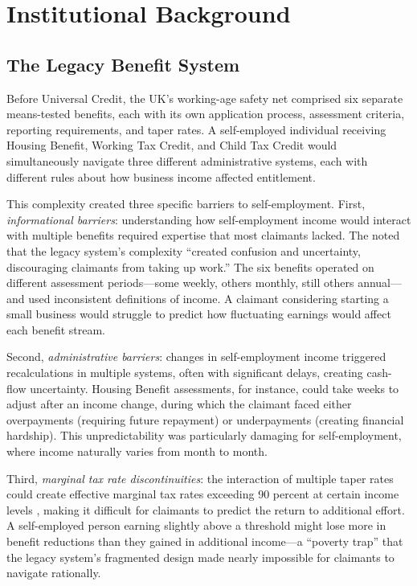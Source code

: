 \documentclass[12pt]{article}
\begin{document}
\section{Institutional Background}
\label{sec:background}

\subsection{The Legacy Benefit System}

Before Universal Credit, the UK's working-age safety net comprised six separate means-tested benefits, each with its own application process, assessment criteria, reporting requirements, and taper rates. A self-employed individual receiving Housing Benefit, Working Tax Credit, and Child Tax Credit would simultaneously navigate three different administrative systems, each with different rules about how business income affected entitlement.

This complexity created three specific barriers to self-employment. First, \textit{informational barriers}: understanding how self-employment income would interact with multiple benefits required expertise that most claimants lacked. The \citet{uk2013uc} noted that the legacy system's complexity ``created confusion and uncertainty, discouraging claimants from taking up work.'' The six benefits operated on different assessment periods---some weekly, others monthly, still others annual---and used inconsistent definitions of income. A claimant considering starting a small business would struggle to predict how fluctuating earnings would affect each benefit stream.

Second, \textit{administrative barriers}: changes in self-employment income triggered recalculations in multiple systems, often with significant delays, creating cash-flow uncertainty. Housing Benefit assessments, for instance, could take weeks to adjust after an income change, during which the claimant faced either overpayments (requiring future repayment) or underpayments (creating financial hardship). This unpredictability was particularly damaging for self-employment, where income naturally varies from month to month.

Third, \textit{marginal tax rate discontinuities}: the interaction of multiple taper rates could create effective marginal tax rates exceeding 90 percent at certain income levels \citep{mirrlees2011tax}, making it difficult for claimants to predict the return to additional effort. A self-employed person earning slightly above a threshold might lose more in benefit reductions than they gained in additional income---a ``poverty trap'' that the legacy system's fragmented design made nearly impossible for claimants to navigate rationally.
\end{document}
